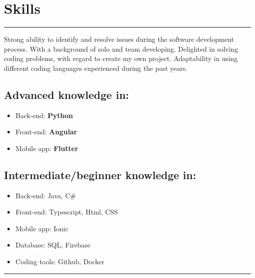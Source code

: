 \documentclass[a4paper,10pt]{article}
\begin{document}
\begin{minipage}[t]{0.25\textwidth}
    \section*{Skills}
    \vspace{5.9cm}
    \rule{0.6cm}{0.3mm}
\end{minipage}
\hfill
\begin{minipage}[t]{0.75\textwidth}
    
    Strong ability to identify and resolve issues during the software development process. With a background of solo and team developing. Delighted in solving coding problems, with regard to create my own project. Adaptability in using different coding languages experienced during the past years.
    \subsection*{Advanced knowledge in:}
    \begin{itemize}[leftmargin=1cm]
        \item Back-end: \textbf{Python} 
        \item Front-end: \textbf{Angular}
        \item Mobile app: \textbf{Flutter}
    \end{itemize}
    \subsection*{Intermediate/beginner knowledge in:}
    \begin{itemize}[leftmargin=1cm]
        \item Back-end: Java, C\# 
        \item Front-end: Typescript, Html, CSS
        \item Mobile app: Ionic
        \item Database: SQL, Firebase
        \item Coding tools: Github, Docker
    \end{itemize}

    \rule{\linewidth}{0.5mm}
\end{minipage}
\end{document}

